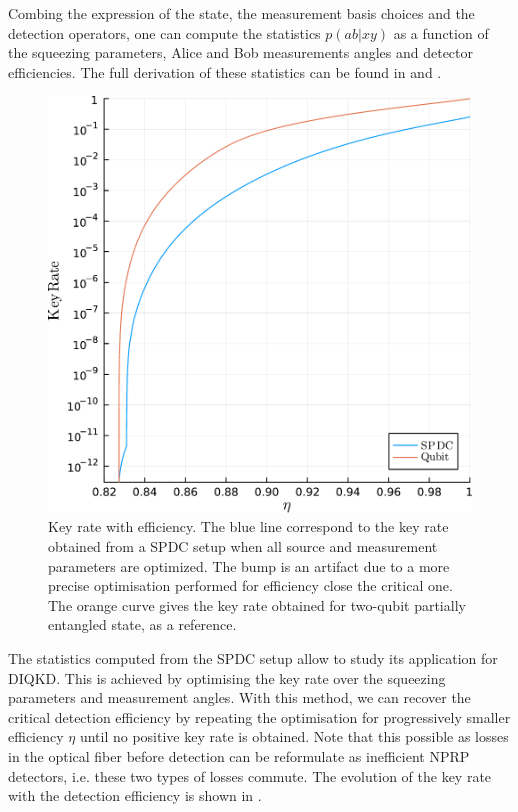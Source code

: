 Combing the expression of the state, the measurement basis choices and the detection operators, one can compute the statistics $p(ab|xy)$ as a function of the squeezing parameters, Alice and Bob measurements angles and detector efficiencies.
The full derivation of these statistics can be found in \cite{Vivoli2015b} and \cite{Ho2020}.

\medbreak

\begin{figure}[ht!]
	\begin{center}
		\includegraphics[width=.95\textwidth]{chapters/deviceindependent/img/key_rate_spdc.pdf}
	\end{center}
	\caption{Key rate with efficiency. The blue line correspond to the key rate obtained from a SPDC setup when all source and measurement parameters are optimized. The bump is an artifact due to a more precise optimisation performed for efficiency close the critical one. The orange curve gives the key rate obtained for two-qubit partially entangled state, as a reference.}
	\label{fig:SPDC_kr}
\end{figure}

The statistics computed from the SPDC setup allow to study its application for DIQKD.
This is achieved by optimising the key rate over the squeezing parameters and measurement angles.
With this method, we can recover the critical detection efficiency by repeating the optimisation for progressively smaller efficiency $\eta$ until no positive key rate is obtained.
Note that this possible as losses in the optical fiber before detection can be reformulate as inefficient NPRP detectors, i.e. these two types of losses commute. 
The evolution of the key rate with the detection efficiency is shown in .

